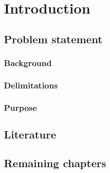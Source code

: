 \chapter{Introduction}
\lipsum[1]

\section{Problem statement}
\lipsum[1]

\subsection{Background}
\subsection{Delimitations}
\subsection{Purpose}

\section{Literature}
\lipsum[1]

\section{Remaining chapters}
\lipsum[1]
